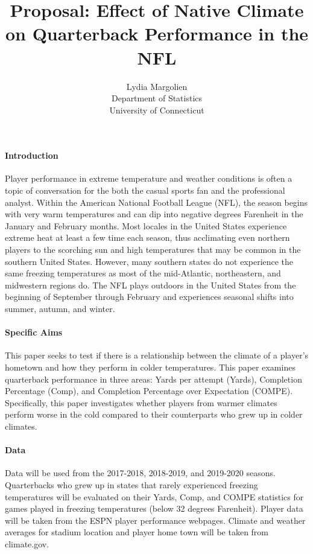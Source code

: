 \documentclass[12pt]{article}
\title{Proposal: Effect of Native Climate on Quarterback Performance in the NFL}
\author{Lydia Margolien\\
  Department of Statistics\\
  University of Connecticut
}
\begin{document}
\maketitle


\paragraph{Introduction}

Player performance in extreme temperature and weather conditions is often a topic of 
conversation for the both the casual sports fan and the professional analyst. Within 
the American National Football League (NFL), the season begins with very warm temperatures
and can dip into negative degrees Farenheit in the January and February months.  Most 
locales in the United States experience extreme heat at least a few time each season, 
thus acclimating even northern players to the scorching sun and high temperatures that 
may be common in the southern United States. However, many southern states do not experience 
the same freezing temperatures as most of the mid-Atlantic, northeastern, and midwestern 
regions do. The NFL plays outdoors in the United States from the beginning of September through
February and experiences seasonal shifts into summer, autumn, and winter. 

\lipsum[1] 

\paragraph{Specific Aims}
This paper seeks to test if there is a relationship between the climate of a player's hometown 
and how they perform in colder temperatures. This paper examines quarterback performance in three 
areas: Yards per attempt (Yards), Completion Percentage (Comp), and Completion Percentage over 
Expectation (COMPE). Specifically, this paper investigates whether players from warmer climates 
perform worse in the cold compared to their counterparts who grew up in colder climates. 

\lipsum[2]

\paragraph{Data}
Data will be used from the 2017-2018, 2018-2019, and 2019-2020 seasons. Quarterbacks who grew up
in states that rarely experienced freezing temperatures will be evaluated on their Yards, Comp, 
and COMPE statistics for games played in freezing temperatures (below 32 degrees Farenheit). 
Player data will be taken from the ESPN player performance webpages. Climate and weather averages 
for stadium location and player home town will be taken from climate.gov. 
\end{document}
